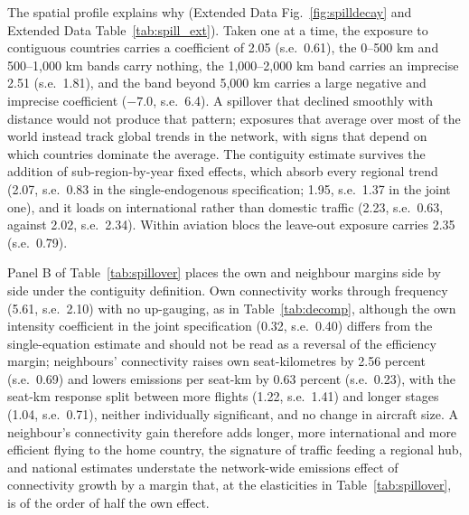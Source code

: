 \documentclass[12pt]{article}
\begin{document}
The spatial profile explains why (Extended Data Fig.~\ref{fig:spilldecay}
and Extended Data Table~\ref{tab:spill_ext}). Taken one at a time, the
exposure to contiguous countries carries a coefficient of 2.05 (s.e.\
0.61), the 0--500 km and 500--1{,}000 km bands carry nothing, the
1{,}000--2{,}000 km band carries an imprecise 2.51 (s.e.\ 1.81), and the
band beyond 5{,}000 km carries a large negative and imprecise coefficient
($-7.0$, s.e.\ 6.4). A spillover that declined smoothly with distance
would not produce that pattern; exposures that average over most of the
world instead track global trends in the network, with signs that depend
on which countries dominate the average. The contiguity estimate survives
the addition of sub-region-by-year fixed effects, which absorb every
regional trend (2.07, s.e.\ 0.83 in the single-endogenous specification;
1.95, s.e.\ 1.37 in the joint one), and it loads on international rather
than domestic traffic (2.23, s.e.\ 0.63, against 2.02, s.e.\ 2.34).
Within aviation blocs the leave-out exposure carries 2.35 (s.e.\ 0.79).

Panel B of Table~\ref{tab:spillover} places the own and neighbour margins
side by side under the contiguity definition. Own connectivity works
through frequency (5.61, s.e.\ 2.10) with no up-gauging, as in
Table~\ref{tab:decomp}, although the own intensity coefficient in the
joint specification (0.32, s.e.\ 0.40) differs from the single-equation
estimate and should not be read as a reversal of the efficiency margin;
neighbours' connectivity raises own seat-kilometres by 2.56 percent (s.e.\
0.69) and lowers emissions per seat-km by 0.63 percent (s.e.\ 0.23), with
the seat-km response split between more flights (1.22, s.e.\ 1.41) and
longer stages (1.04, s.e.\ 0.71), neither individually significant, and
no change in aircraft size. A neighbour's connectivity gain therefore
adds longer, more international and more efficient flying to the home
country, the signature of traffic feeding a regional hub, and national
estimates understate the network-wide emissions effect of connectivity
growth by a margin that, at the elasticities in Table~\ref{tab:spillover},
is of the order of half the own effect.

\end{document}
